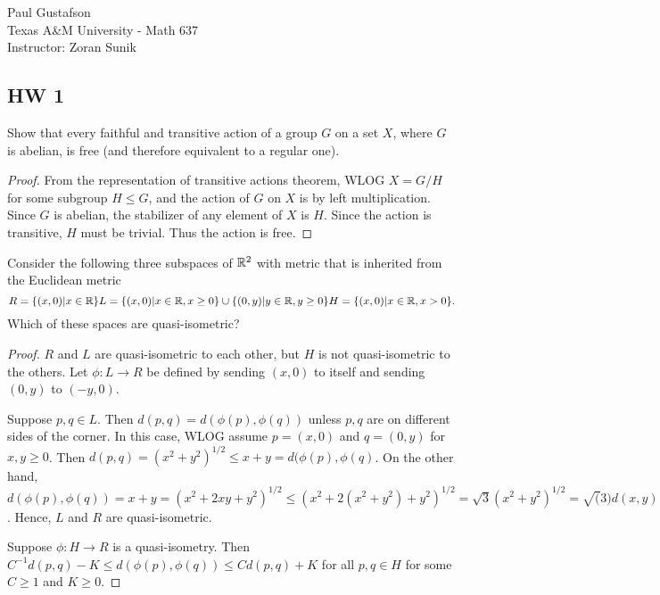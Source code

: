 \documentclass{article}
\begin{document}
\noindent Paul Gustafson\\
\noindent Texas A\&M University - Math 637\\ 
\noindent Instructor: Zoran Sunik

\subsection*{HW 1}
  Show that every faithful and transitive action of a group $G$ on a set $X$, where $G$ is abelian, is free (and therefore equivalent to a regular one).
\begin{proof}
From the representation of transitive actions theorem, WLOG $X = G/H$ for some subgroup $H \le G$, and the action of $G$ on $X$ is by left multiplication.
Since $G$ is abelian, the stabilizer of any element of $X$ is $H$. Since the action is transitive, $H$ must be trivial. Thus the action is free.
\end{proof}

 Consider the following three subspaces of $\mathbb{R}^2$ with metric that is inherited from the Euclidean metric
$$
R = \{ (x,0) | x \in \mathbb{R} \}
\\
L = \{ (x,0) | x \in \mathbb{R}, x \ge 0\} \cup \{(0,y) | y \in \mathbb{R}, y \ge 0 \}
\\
H = \{ (x, 0) | x \in \mathbb{R}, x > 0 \}.
$$
Which of these spaces are quasi-isometric?
\begin{proof}
$R$ and $L$ are quasi-isometric to each other, but $H$ is not quasi-isometric to the others.
Let $\phi: L \to R$ be defined by sending $(x,0)$ to itself and sending $(0,y)$ to $(-y,0)$.

Suppose $p,q \in L$.  Then $d(p,q) = d(\phi(p), \phi(q))$ unless $p,q$ are on different sides of the corner.
In this case, WLOG assume $p = (x,0)$ and $q = (0,y)$ for $x,y \ge 0$.  Then $d(p,q) = (x^2 + y^2)^{1/2} \le x + y = d(\phi(p), \phi(q)$.
On the other hand, $d(\phi(p), \phi(q)) = x + y = (x^2 + 2xy + y^2)^{1/2} \le (x^2 + 2(x^2 + y^2) + y^2)^{1/2} =  \sqrt{3} (x^2 + y^2)^{1/2} = \sqrt(3) d(x,y)$.
Hence, $L$ and $R$ are quasi-isometric.

Suppose $\phi: H \to R$ is a quasi-isometry. Then $C^{-1} d(p,q) - K \le d(\phi(p), \phi(q)) \le C d(p,q) + K$ for all $p,q \in H$ for some $C \ge 1$ and $K \ge 0$.
\end{proof}
\end{document}
